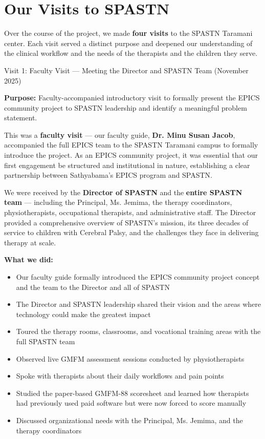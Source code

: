 \documentclass[11pt,a4paper]{article}
\begin{document}
\section{Our Visits to SPASTN}

Over the course of the project, we made \textbf{four visits} to the SPASTN Taramani center. Each visit served a distinct purpose and deepened our understanding of the clinical workflow and the needs of the therapists and the children they serve.

\begin{visitbox}[visitblue]{Visit 1: Faculty Visit --- Meeting the Director and SPASTN Team (November 2025)}

\textbf{Purpose:} Faculty-accompanied introductory visit to formally present the EPICS community project to SPASTN leadership and identify a meaningful problem statement.

This was a \textbf{faculty visit} --- our faculty guide, \textbf{Dr. Minu Susan Jacob}, accompanied the full EPICS team to the SPASTN Taramani campus to formally introduce the project. As an EPICS community project, it was essential that our first engagement be structured and institutional in nature, establishing a clear partnership between Sathyabama's EPICS program and SPASTN.

We were received by the \textbf{Director of SPASTN} and the \textbf{entire SPASTN team} --- including the Principal, Ms. Jemima, the therapy coordinators, physiotherapists, occupational therapists, and administrative staff. The Director provided a comprehensive overview of SPASTN's mission, its three decades of service to children with Cerebral Palsy, and the challenges they face in delivering therapy at scale.

\textbf{What we did:}
\begin{itemize}[leftmargin=1.5em, itemsep=2pt]
    \item Our faculty guide formally introduced the EPICS community project concept and the team to the Director and all of SPASTN
    \item The Director and SPASTN leadership shared their vision and the areas where technology could make the greatest impact
    \item Toured the therapy rooms, classrooms, and vocational training areas with the full SPASTN team
    \item Observed live GMFM assessment sessions conducted by physiotherapists
    \item Spoke with therapists about their daily workflows and pain points
    \item Studied the paper-based GMFM-88 scoresheet and learned how therapists had previously used paid software but were now forced to score manually
    \item Discussed organizational needs with the Principal, Ms. Jemima, and the therapy coordinators
\end{itemize}


\end{visitbox}
\end{document}
